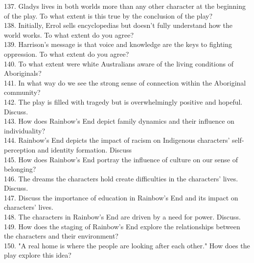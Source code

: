 \documentclass[a4paper]{article}
\begin{document}
137. Gladys lives in both worlds more than any other character at the beginning of the play. To what extent is this true by the conclusion of the play?\\

138. Initially, Errol sells encyclopedias but doesn't fully understand how the world works. To what extent do you agree?\\

139. Harrison's message is that voice and knowledge are the keys to fighting oppression. To what extent do you agree?\\

140. To what extent were white Australians aware of the living conditions of Aboriginals?\\

141. In what way do we see the strong sense of connection within the Aboriginal community?\\

142. The play is filled with tragedy but is overwhelmingly positive and hopeful. Discuss.\\

143. How does Rainbow's End depict family dynamics and their influence on individuality?\\

144. Rainbow's End depicts the impact of racism on Indigenous characters' self-perception and identity formation. Discuss\\

145. How does Rainbow's End portray the influence of culture on our sense of belonging?\\

146. The dreams the characters hold create difficulties in the characters' lives. Discuss.\\

147. Discuss the importance of education in Rainbow's End and its impact on characters' lives.\\

148. The characters in Rainbow's End are driven by a need for power. Discuss.\\

149. How does the staging of Rainbow's End explore the relationships between the characters and their environment?\\

150. "A real home is where the people are looking after each other." How does the play explore this idea?\\
\end{document}
